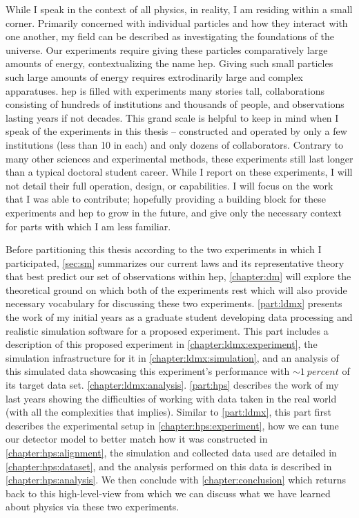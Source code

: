 While I speak in the context of all physics, in reality, I am residing within a small corner.
Primarily concerned with individual particles and how they interact with one another, my field can
be described as investigating the foundations of the universe. Our experiments require giving these
particles comparatively large amounts of energy, contextualizing the name \ac{hep}. Giving
such small particles such large amounts of energy requires extrodinarily large and complex
apparatuses. \ac{hep} is filled with experiments many stories tall, collaborations consisting of
hundreds of institutions and thousands of people, and observations lasting years if not decades.
This grand scale is helpful to keep in mind when I speak of the experiments in this thesis --
constructed and operated by only a few institutions (less than 10 in each) and only dozens of collaborators. Contrary to many other
sciences and experimental methods, these experiments still last longer than a typical doctoral
student career. While I report on these experiments, I will not detail their full operation,
design, or capabilities. I will focus on the work that I was able to contribute; hopefully
providing a building block for these experiments and \ac{hep} to grow in the future, and give only
the necessary context for parts with which I am less familiar.

Before partitioning this thesis according to the two experiments in which I participated,
\cref{sec:sm} summarizes our current laws and its representative theory that best predict our set
of observations within \ac{hep}, \cref{chapter:dm} will explore the theoretical ground on which
both of the experiments rest which will also provide necessary vocabulary for discussing these two
experiments. \cref{part:ldmx} presents the work of my initial years as a graduate student
developing data processing and realistic simulation software for a proposed experiment. This part
includes a description of this proposed experiment in \cref{chapter:ldmx:experiment}, the
simulation infrastructure for it in \cref{chapter:ldmx:simulation}, and an analysis of this
simulated data showcasing this experiment's performance with $\sim\qty{1}{percent}$ of its
target data set. \cref{chapter:ldmx:analysis}.
\cref{part:hps} describes the work of my last years showing the
difficulties of working with data taken in the real world (with all the complexities that implies).
Similar to \cref{part:ldmx}, this part first describes the experimental setup in
\cref{chapter:hps:experiment}, how we can tune our detector model to better match how it was constructed
in \cref{chapter:hps:alignment}, the simulation and collected data used are detailed in \cref{chapter:hps:dataset},
and the analysis performed on this data is described in \cref{chapter:hps:analysis}.
We then conclude with \cref{chapter:conclusion} which returns back to this high-level-view
from which we can discuss what we have learned about physics via these two experiments.

